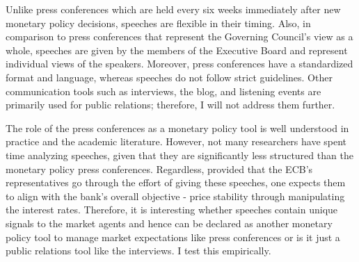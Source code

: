 Unlike press conferences which are held every six weeks immediately after new monetary policy decisions, speeches are flexible in their timing. Also, in comparison to press conferences that represent the Governing Council's view as a whole, speeches are given by the members of the Executive Board and represent individual views of the speakers. Moreover, press conferences have a standardized format and language, whereas speeches do not follow strict guidelines. Other communication tools such as interviews, the blog, and listening events are primarily used for public relations; therefore, I will not address them further.  

The role of the press conferences as a monetary policy tool is well understood in practice and the academic literature. However, not many researchers have spent time analyzing speeches, given that they are significantly less structured than the monetary policy press conferences. Regardless, provided that the ECB's representatives go through the effort of giving these speeches, one expects them to align with the bank's overall objective - price stability through manipulating the interest rates. Therefore, it is interesting whether speeches contain unique signals to the market agents and hence can be declared as another monetary policy tool to manage market expectations like press conferences or is it just a public relations tool like the interviews. I test this empirically.  

